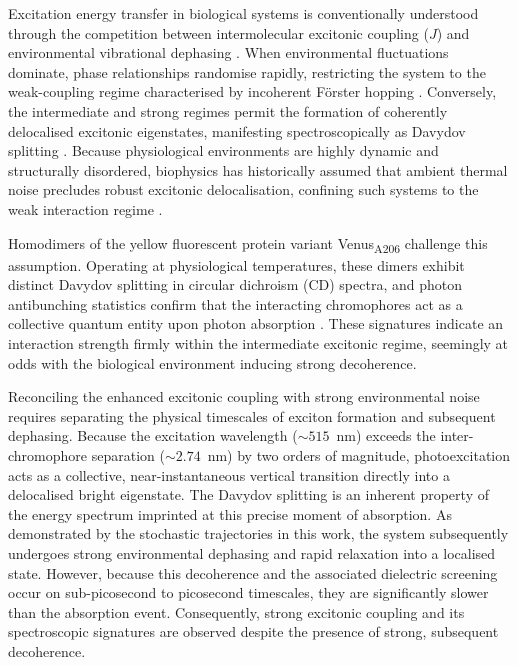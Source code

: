 \documentclass[journal=jpclcd, manuscript=letter, layout=twocolumn, doi=true]{achemso}
\begin{document}
Excitation energy transfer in biological systems is conventionally understood through the competition between intermolecular excitonic coupling ($J$) and environmental vibrational dephasing \cite{forster1965delocalized, may2004charge}. When environmental fluctuations dominate, phase relationships randomise rapidly, restricting the system to the weak-coupling regime characterised by incoherent Förster hopping \cite{forster1948intermolecular}. Conversely, the intermediate and strong regimes permit the formation of coherently delocalised excitonic eigenstates, manifesting spectroscopically as Davydov splitting \cite{davydov1971}. Because physiological environments are highly dynamic and structurally disordered, biophysics has historically assumed that ambient thermal noise precludes robust excitonic delocalisation, confining such systems to the weak interaction regime \cite{kim2021quantum}.

Homodimers of the yellow fluorescent protein variant Venus\textsubscript{A206} challenge this assumption. Operating at physiological temperatures, these dimers exhibit distinct Davydov splitting in circular dichroism (CD) spectra, and photon antibunching statistics confirm that the interacting chromophores act as a collective quantum entity upon photon absorption \cite{kim2019venusa206, freed2025effect}. These signatures indicate an interaction strength firmly within the intermediate excitonic regime, seemingly at odds with the biological environment inducing strong decoherence.

Reconciling the enhanced excitonic coupling with strong environmental noise requires separating the physical timescales of exciton formation and subsequent dephasing. Because the excitation wavelength ($\sim 515$~nm) exceeds the inter-chromophore separation ($\sim 2.74$~nm) by two orders of magnitude, photoexcitation acts as a collective, near-instantaneous vertical transition directly into a delocalised bright eigenstate. The Davydov splitting is an inherent property of the energy spectrum imprinted at this precise moment of absorption. As demonstrated by the stochastic trajectories in this work, the system subsequently undergoes strong environmental dephasing and rapid relaxation into a localised state. However, because this decoherence and the associated dielectric screening occur on sub-picosecond to picosecond timescales, they are significantly slower than the absorption event. Consequently, strong excitonic coupling and its spectroscopic signatures are observed despite the presence of strong, subsequent decoherence.
\end{document}
